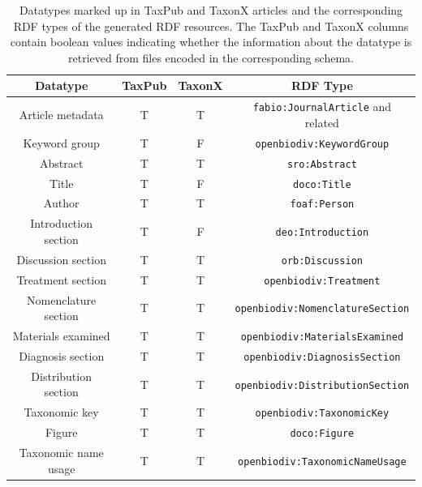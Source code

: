 \begin{table}[h!]
\caption{Datatypes marked up in TaxPub and TaxonX articles and the corresponding RDF types of the generated RDF resources. The TaxPub and TaxonX columns contain boolean values indicating whether the information about the datatype is retrieved from files encoded in the corresponding schema.}
      \begin{tabular}{cccc}
        \hline
          Datatype             & TaxPub & TaxonX & RDF Type\\  \hline
          Article metadata     & T & T & {\tt fabio:JournalArticle} and related\\
          Keyword group        & T & F & {\tt openbiodiv:KeywordGroup} \\
          Abstract             & T & T & {\tt sro:Abstract}\\
          Title                & T & F & {\tt doco:Title} \\
          Author               & T & T & {\tt foaf:Person} \\
          Introduction section & T & F & {\tt deo:Introduction}\\
          Discussion section   & T & T & {\tt orb:Discussion}\\
          Treatment section    & T & T & {\tt openbiodiv:Treatment}\\
          Nomenclature section & T & T & {\tt openbiodiv:NomenclatureSection}\\
          Materials examined   & T & T & {\tt openbiodiv:MaterialsExamined}\\
          Diagnosis section    & T & T & {\tt openbiodiv:DiagnosisSection} \\
          Distribution section & T & T & {\tt openbiodiv:DistributionSection}\\
          Taxonomic key        & T & T & {\tt openbiodiv:TaxonomicKey}\\
          Figure               & T & T & {\tt doco:Figure}\\
          Taxonomic name usage & T & T & {\tt openbiodiv:TaxonomicNameUsage}
      \end{tabular}
      \label{datatypes-taxpub-taxonx}
\end{table}

